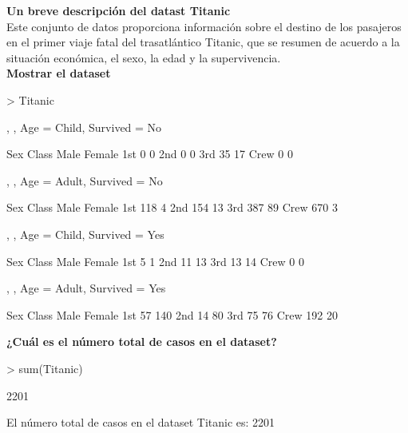 \documentclass[6pt]{report}
\begin{document}
\textbf{Un breve descripción del datast Titanic}\\
Este conjunto de datos proporciona información sobre el destino de los pasajeros en el primer viaje fatal del trasatlántico Titanic, que se resumen de acuerdo a la situación económica, el sexo, la edad y la supervivencia.\\

\textbf{Mostrar el dataset}
\begin{Schunk}
\begin{Sinput}
> Titanic
\end{Sinput}
\begin{Soutput}
, , Age = Child, Survived = No

      Sex
Class  Male Female
  1st     0      0
  2nd     0      0
  3rd    35     17
  Crew    0      0

, , Age = Adult, Survived = No

      Sex
Class  Male Female
  1st   118      4
  2nd   154     13
  3rd   387     89
  Crew  670      3

, , Age = Child, Survived = Yes

      Sex
Class  Male Female
  1st     5      1
  2nd    11     13
  3rd    13     14
  Crew    0      0

, , Age = Adult, Survived = Yes

      Sex
Class  Male Female
  1st    57    140
  2nd    14     80
  3rd    75     76
  Crew  192     20
\end{Soutput}
\end{Schunk}

\textbf{¿Cuál es el número total de casos en el dataset?}
\begin{Schunk}
\begin{Sinput}
> sum(Titanic)
\end{Sinput}
\begin{Soutput}
[1] 2201
\end{Soutput}
\end{Schunk}
El número total de casos en el dataset Titanic es: 2201
\end{document}

